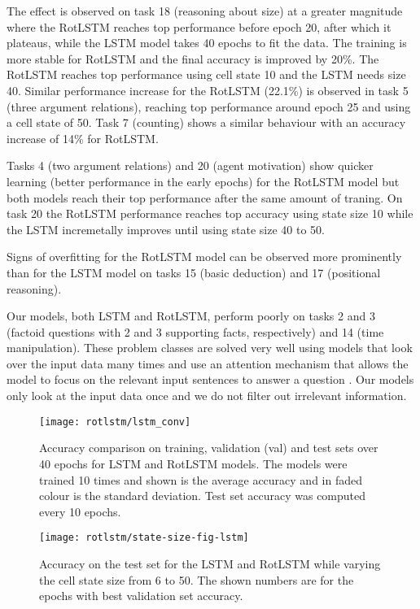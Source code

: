 \documentclass{article}
\begin{document}
The effect is observed on task 18 (reasoning about size) at a greater magnitude where the RotLSTM reaches top performance before epoch 20, after which it plateaus, while the LSTM model takes 40 epochs to fit the data. The training is more stable for RotLSTM and the final accuracy is improved by 20\%. The RotLSTM reaches top performance using cell state 10 and the LSTM needs size 40. Similar performance increase for the RotLSTM
(22.1\%) is observed in task 5 (three argument relations), reaching top performance around epoch 25 and using a cell state of 50. Task 7 (counting) shows a similar behaviour with an accuracy increase of 14\% for RotLSTM.

Tasks 4 (two argument relations) and 20 (agent motivation) show quicker learning (better performance in the early epochs) for the RotLSTM model but both models reach their top performance after the same amount of traning. On task 20 the RotLSTM performance reaches top accuracy using state size 10 while the LSTM incremetally improves until using state size 40 to 50.

Signs of overfitting for the RotLSTM model can be observed more prominently than for the LSTM model on tasks 15 (basic deduction) and 17 (positional reasoning).

Our models, both LSTM and RotLSTM, perform poorly on tasks 2 and 3 (factoid questions with 2 and 3 supporting facts, respectively) and 14 (time manipulation). These problem classes are solved very well using models that look over the input data many times and use an attention mechanism that allows the model to focus on the relevant input sentences to answer a question \citep{sukhbaatar2015end, kumar2016ask}. Our models only look at the input data once and we do not filter out irrelevant information.

\begin{figure}[htb]
\begin{center}
\texttt{[image: rotlstm/lstm\_conv]}
\end{center}
\caption[LSTM and RotLSTM results on bAbI]{Accuracy comparison on training, validation (val) and test sets over 40 epochs for LSTM and RotLSTM models. The models were trained 10 times and shown is the average accuracy and in faded colour is the standard deviation. Test set accuracy was computed every 10 epochs.}
\label{fig:lstm_converge}
\end{figure}

\begin{figure}[htb]
\begin{center}
\texttt{[image: rotlstm/state-size-fig-lstm]}
\end{center}
\caption[LSTM and RotLSTM results with different state cell sizes]{Accuracy on the test set for the LSTM and RotLSTM while varying the cell state size from 6 to 50. The shown numbers are for the epochs with best validation set accuracy.}
\label{fig:state-size-fig-lstm}
\end{figure}
\end{document}

